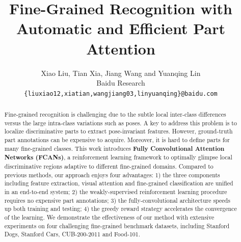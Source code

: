 \documentclass[10pt,twocolumn,letterpaper]{article}
\begin{document}
\title{Fine-Grained Recognition with Automatic and Efficient Part Attention}

\author{Xiao Liu, Tian Xia, Jiang Wang and Yuanqing Lin\\
Baidu Research\\
{\tt\small \{liuxiao12,xiatian,wangjiang03,linyuanqing\}@baidu.com}
}

\maketitle

\begin{abstract}
Fine-grained recognition is challenging due to the subtle local inter-class differences versus the large intra-class variations such as poses.
A key to address this problem is to localize discriminative parts to extract pose-invariant features.
However, ground-truth part annotations can be expensive to acquire.
Moreover, it is hard to define parts for many fine-grained classes.
This work introduces \textbf{Fully Convolutional Attention Networks (FCANs)}, a reinforcement learning framework to optimally glimpse local discriminative regions adaptive to different fine-grained domains.
Compared to previous methods, our approach enjoys four advantages:
1) the three components including feature extraction, visual attention and fine-grained classification are unified in an end-to-end system;
2) the weakly-supervised reinforcement learning procedure requires no expensive part annotations;
3) the fully-convolutional architecture speeds up both training and testing;
4) the greedy reward strategy accelerates the convergence of the learning.
We demonstrate the effectiveness of our method with extensive experiments on four challenging fine-grained benchmark datasets, including Stanford Dogs, Stanford Cars, CUB-200-2011 and Food-101.
\end{abstract}
\end{document}
